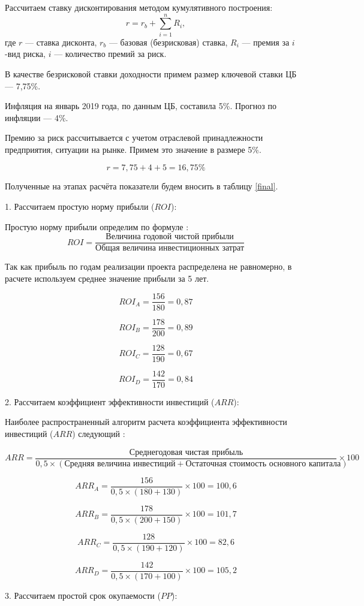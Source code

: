Рассчитаем ставку дисконтирования методом кумулятивного построения:
\[ r = r_b + \sum\limits_{i=1}^{n} R_i, \]
где  $r$ --- ставка дисконта,
$r_b$ --- базовая (безрисковая) ставка,
$R_i$ --- премия за $i$-вид риска,
$i$ --- количество премий за риск.

В качестве безрисковой ставки доходности примем размер ключевой ставки ЦБ --- 7,75\%. 

Инфляция на январь 2019 года, по данным ЦБ, составила 5\%. Прогноз по инфляции --- 4\%.

Премию за риск рассчитывается с учетом отраслевой принадлежности предприятия, ситуации на рынке. Примем это значение в размере 5\%.

\[ r = 7,75  + 4 + 5 = 16,75 \%\]

Полученные на этапах расчёта показатели будем вносить в таблицу \ref{final}.

1. Рассчитаем простую норму прибыли ($ROI$):

Простую норму прибыли определим по формуле \cite[174]{sergeev}:
\[ ROI = \dfrac{\text{Величина годовой чистой прибыли}}{\text{Общая величина инвестиционных затрат}}\]

Так как прибыль по годам реализации проекта распределена не равномерно, в расчете используем среднее значение прибыли за 5 лет.

\[ ROI_A = \dfrac{156}{180} = 0,87\]

\[ ROI_B = \dfrac{178}{200}=0,89\]

\[ ROI_C = \dfrac{128}{190}=0,67\]

\[ ROI_D =  \dfrac{142}{170}=0,84\]

2. Рассчитаем коэффициент эффективности инвестиций ($ARR$):

Наиболее распространенный алгоритм расчета коэффициента эффективности инвестиций ($ARR$) следующий \cite[214]{leontev}:

\[ ARR = \dfrac{\text{Среднегодовая чистая прибыль}}{0,5 \times (\text{Средняя величина инвестиций} + \text{Остаточная стоимость основного капитала})} \times 100 \]

\[ ARR_A =  \dfrac{156}{0,5 \times (180 + 130)} \times 100 =100,6\]

\[ ARR_B =   \dfrac{178}{0,5 \times (200 + 150)} \times 100 =101,7\]

\[ ARR_C =  \dfrac{128}{0,5 \times (190 + 120)} \times 100 =82,6\]

\[ ARR_D =  \dfrac{142}{0,5 \times (170 + 100)} \times 100 =105,2\]

3. Рассчитаем простой срок окупаемости ($PP$):

